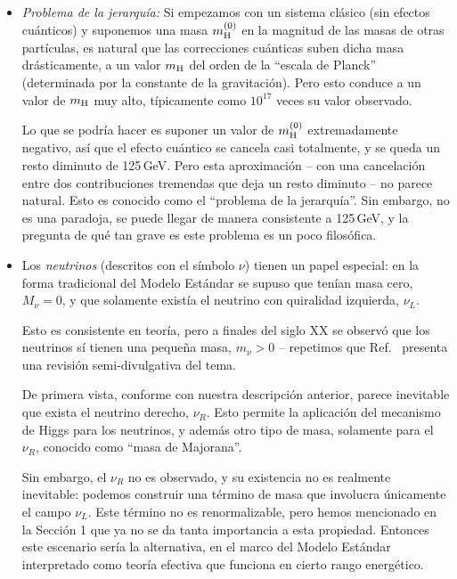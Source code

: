 \begin{itemize}

\item {\em Problema de la jerarqu\'ia:} Si empezamos con un sistema
cl\'asico (sin efectos cu\'anticos) y suponemos una masa $m_{\rm H}^{(0)}$
en la magnitud de las masas de otras part\'iculas,
es natural que las correcciones cu\'anticas suben dicha masa
dr\'asticamente, a un valor $m_{\rm H}$ del orden de la ``escala de
Planck'' (determinada por la constante de la gravitaci\'on).
Pero esto conduce a un valor de $m_{\rm H}$ muy alto, t\'ipicamente
como $10^{17}$ veces su valor observado.

Lo que se podr\'ia hacer es suponer un valor de $m_{\rm H}^{(0)}$
extremadamente negativo, as\'i que el efecto cu\'antico
se cancela casi totalmente, y se queda un resto diminuto
de 125\,GeV. Pero esta aproximaci\'on -- con una cancelaci\'on
entre dos contribuciones tremendas que deja un resto diminuto --
no parece natural. Esto es conocido como el ``problema de la
jerarqu\'ia''. Sin embargo, no es una paradoja, se puede llegar
de manera consistente a 125\,GeV, y la pregunta de qu\'e tan
grave es este problema es un poco filos\'ofica.

\item Los {\em neutrinos} (descritos con el s\'imbolo $\nu$) tienen
un papel especial: en la forma tradicional del Modelo
Est\'andar se supuso que ten\'ian masa cero, $M_{\nu} =0$,
y que solamente exist\'ia el neutrino con quiralidad izquierda,
$\nu_L$.

Esto es consistente en teor\'ia, pero a finales del siglo XX
se observ\'o que los neutrinos s\'i tienen una peque\~na masa,
$m_{\nu}>0$ -- repetimos que Ref.\ \cite{neutrinos} presenta una
revisi\'on semi-divulgativa del tema.

De primera vista, conforme con nuestra descripci\'on anterior,
parece inevitable que exista el neutrino derecho, $\nu_R$.  
Esto permite la aplicaci\'on del mecanismo de Higgs para los
neutrinos, y adem\'as otro tipo de masa, solamente para el
$\nu_R$, conocido como ``masa de Majorana''.

Sin embargo, el $\nu_R$ no es observado, y su existencia no
es realmente inevitable: podemos construir una t\'ermino de masa
que involucra \'unicamente el campo $\nu_L$. Este t\'ermino no
es renormalizable, pero hemos mencionado en la Secci\'on 1 que ya no
se da tanta importancia a esta propiedad. Entonces este escenario
ser\'ia la alternativa, en el marco del Modelo Est\'andar interpretado
como teor\'ia efectiva que funciona en cierto rango energ\'etico.


\end{itemize}
